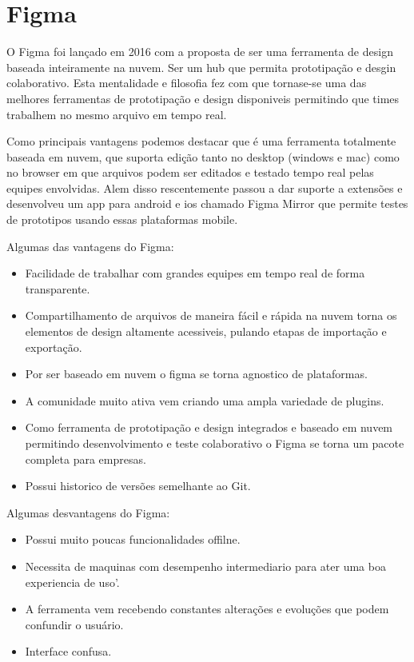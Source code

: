 \section{Figma} \label{Figma}

O Figma foi lançado em 2016 com a proposta de ser uma ferramenta de design baseada inteiramente na nuvem. Ser um hub que permita prototipação
e desgin colaborativo. Esta mentalidade e filosofia fez com que tornase-se uma das melhores ferramentas de prototipação e design disponiveis permitindo que times trabalhem no mesmo arquivo em tempo real.

Como principais vantagens podemos destacar que é uma ferramenta totalmente baseada em nuvem, que suporta edição tanto no desktop (windows e mac) como no browser em que arquivos podem ser editados e testado tempo real pelas equipes envolvidas. Alem disso rescentemente passou a dar suporte a extensões e desenvolveu um app para android e ios chamado Figma Mirror que permite testes de prototipos usando essas plataformas mobile.

Algumas das vantagens do Figma:
\begin{itemize}
  \item Facilidade de trabalhar com grandes equipes em tempo real de forma transparente.
  \item Compartilhamento de arquivos de maneira fácil e rápida na nuvem torna os elementos de design altamente acessiveis, pulando etapas de importação e exportação.
  \item Por ser baseado em nuvem o figma se torna agnostico de plataformas.
  \item A comunidade muito ativa vem criando uma ampla variedade de plugins.
  \item Como ferramenta de prototipação e design integrados e baseado em nuvem permitindo desenvolvimento e teste colaborativo o Figma se torna um pacote completa para empresas.
  \item Possui historico de versões semelhante ao Git.
\end{itemize}

Algumas desvantagens do Figma:
\begin{itemize}
  \item Possui muito poucas funcionalidades offilne.
  \item Necessita de maquinas com desempenho intermediario para ater uma boa experiencia de uso'.
  \item A ferramenta vem recebendo constantes alterações e evoluções que podem confundir o usuário.
  \item Interface confusa.
\end{itemize}

